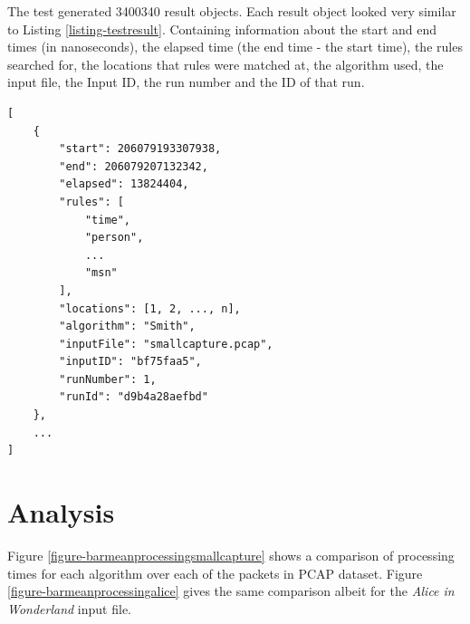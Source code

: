 \documentclass[11pt]{article}
\begin{document}
The test generated 3400340 result objects. Each result object looked very similar to Listing \ref{listing-testresult}. Containing information about the start and end times (in nanoseconds), the elapsed time (the end time - the start time), the rules searched for, the locations that rules were matched at, the algorithm used, the input file, the Input ID, the run number and the ID of that run.

\begin{lstlisting}[caption = {Sample test Result}, label = {listing-testresult}]
[
    {
        "start": 206079193307938,
        "end": 206079207132342,
        "elapsed": 13824404,
        "rules": [
            "time",
            "person",
            ...
            "msn"
        ],
        "locations": [1, 2, ..., n],
        "algorithm": "Smith",
        "inputFile": "smallcapture.pcap",
        "inputID": "bf75faa5",
        "runNumber": 1,
        "runId": "d9b4a28aefbd"
    },
    ...
]
\end{lstlisting}

\section{Analysis}

Figure \ref{figure-barmeanprocessingsmallcapture} shows a comparison of processing times for each algorithm over each of the packets in PCAP dataset. Figure \ref{figure-barmeanprocessingalice} gives the same comparison albeit for the \textit{Alice in Wonderland} input file.
\end{document}
